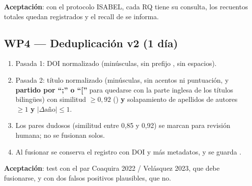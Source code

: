 \documentclass[11pt,a4paper]{article}
\newcommand{\WP}[1]{\textbf{\textcolor{palet}{WP#1}}}
\begin{document}
\textbf{Aceptación}: con el protocolo ISABEL, cada RQ tiene su consulta, los recuentos totales quedan registrados y el recall de  se informa.

\subsection*{\WP{4} — Deduplicación v2 (1 día)}
\begin{enumerate}
  \item Pasada 1: DOI normalizado (minúsculas, sin prefijo , sin espacios).
  \item Pasada 2: título normalizado (minúsculas, sin acentos ni puntuación, y \textbf{partido por ``;'' o ``[''} para quedarse con la parte inglesa de los títulos bilingües) con similitud $\ge 0{,}92$ () \textbf{y} solapamiento de apellidos de autores $\ge 1$ \textbf{y} $|\Delta \text{año}| \le 1$.
  \item Los pares dudosos (similitud entre 0{,}85 y 0{,}92) se marcan para revisión humana; no se fusionan solos.
  \item Al fusionar se conserva el registro con DOI y más metadatos, y se guarda .
\end{enumerate}
\textbf{Aceptación}: test con el par Coaquira 2022 / Velásquez 2023, que debe fusionarse, y con dos falsos positivos plausibles, que no.

\end{document}
